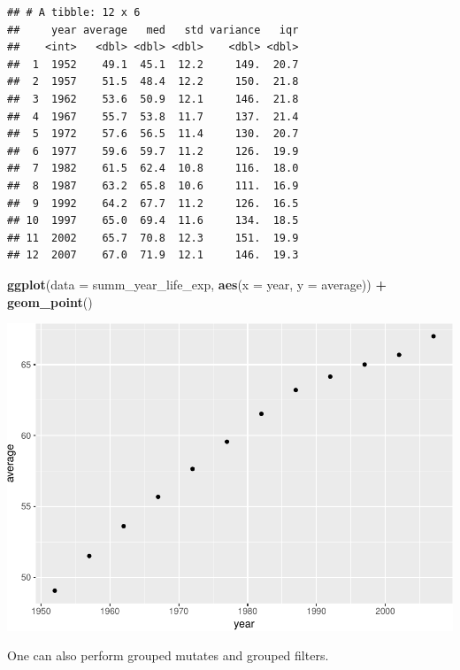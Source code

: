 \documentclass[11pt,]{article}
\newenvironment{Shaded}{\begin{snugshade}}{\end{snugshade}}
\newcommand{\KeywordTok}[1]{\textcolor[rgb]{0.13,0.29,0.53}{\textbf{#1}}}
\newcommand{\DataTypeTok}[1]{\textcolor[rgb]{0.13,0.29,0.53}{#1}}
\newcommand{\StringTok}[1]{\textcolor[rgb]{0.31,0.60,0.02}{#1}}
\newcommand{\OperatorTok}[1]{\textcolor[rgb]{0.81,0.36,0.00}{\textbf{#1}}}
\newcommand{\NormalTok}[1]{#1}
\begin{document}
\begin{verbatim}
## # A tibble: 12 x 6
##     year average   med   std variance   iqr
##    <int>   <dbl> <dbl> <dbl>    <dbl> <dbl>
##  1  1952    49.1  45.1  12.2     149.  20.7
##  2  1957    51.5  48.4  12.2     150.  21.8
##  3  1962    53.6  50.9  12.1     146.  21.8
##  4  1967    55.7  53.8  11.7     137.  21.4
##  5  1972    57.6  56.5  11.4     130.  20.7
##  6  1977    59.6  59.7  11.2     126.  19.9
##  7  1982    61.5  62.4  10.8     116.  18.0
##  8  1987    63.2  65.8  10.6     111.  16.9
##  9  1992    64.2  67.7  11.2     126.  16.5
## 10  1997    65.0  69.4  11.6     134.  18.5
## 11  2002    65.7  70.8  12.3     151.  19.9
## 12  2007    67.0  71.9  12.1     146.  19.3
\end{verbatim}

\begin{Shaded}
\begin{Highlighting}[]
\KeywordTok{ggplot}\NormalTok{(}\DataTypeTok{data =}\NormalTok{ summ_year_life_exp, }
       \KeywordTok{aes}\NormalTok{(}\DataTypeTok{x =}\NormalTok{ year, }\DataTypeTok{y =}\NormalTok{ average)) }\OperatorTok{+}\StringTok{ }
\StringTok{  }\KeywordTok{geom_point}\NormalTok{()}
\end{Highlighting}
\end{Shaded}

\includegraphics{Intro_data_wrangling_files/figure-latex/summ_cont-2.pdf}

One can also perform grouped mutates and grouped filters.
\end{document}
